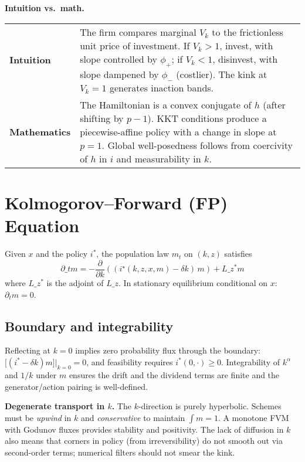 \documentclass[11pt,letterpaper,oneside]{article}
\numberwithin{equation}{section}
\newcommand{\ac}[1]{\textsc{#1}}
\newcommand{\1}{\mathbf{1}}
\newcommand{\Lz}{L\_z}
\newcommand{\Lzadj}{L\_z^{\!*}}
\begin{document}
\begin{tcolorbox}[didacticstyle]
\textbf{Intuition vs.\ math.}
\begin{tabularx}{\textwidth}{@{}p{}X@{}}
\textbf{Intuition} & The firm compares marginal $V_k$ to the frictionless unit price of investment. If $V_k>1$, invest, with slope controlled by $\phi_+$; if $V_k<1$, disinvest, with slope dampened by $\phi_-$ (costlier). The kink at $V_k=1$ generates inaction bands.\\
\textbf{Mathematics} & The Hamiltonian is a convex conjugate of $h$ (after shifting by $p-1$). KKT conditions produce a piecewise-affine policy with a change in slope at $p=1$. Global well-posedness follows from coercivity of $h$ in $i$ and measurability in $k$.
\end{tabularx}
\end{tcolorbox}

\section{Kolmogorov--Forward (FP) Equation}

Given $x$ and the policy $i^*$, the population law $m_t$ on $(k,z)$ satisfies
\begin{equation}
\partial\_t m = -\frac{\partial}{\partial k}\left((i^\star(k,z,x,m)-\delta k)\, m\right) + \Lzadj m
\tag{FP}\label{eq:FP}
\end{equation}
where $\Lzadj$ is the adjoint of $\Lz$. In stationary equilibrium conditional on $x$: $\partial_t m=0$.

\subsection{Boundary and integrability}
Reflecting at $k=0$ implies zero probability flux through the boundary:
$\big[(i^*-\delta k)m\big]\big|_{k=0}=0$,
and feasibility requires $i^*(0,\cdot)\ge 0$. Integrability of $k^\alpha$ and $1/k$ under $m$ ensures the drift and the dividend terms are finite and the generator/action pairing is well-defined.

\begin{tcolorbox}[mathstyle]
\textbf{Degenerate transport in $k$.} The $k$-direction is purely hyperbolic. Schemes must be \emph{upwind} in $k$ and \emph{conservative} to maintain $\int m=1$. A monotone \ac{FVM} with Godunov fluxes provides stability and positivity. The lack of diffusion in $k$ also means that corners in policy (from irreversibility) do not smooth out via second-order terms; numerical filters should not smear the kink.
\end{tcolorbox}
\end{document}
